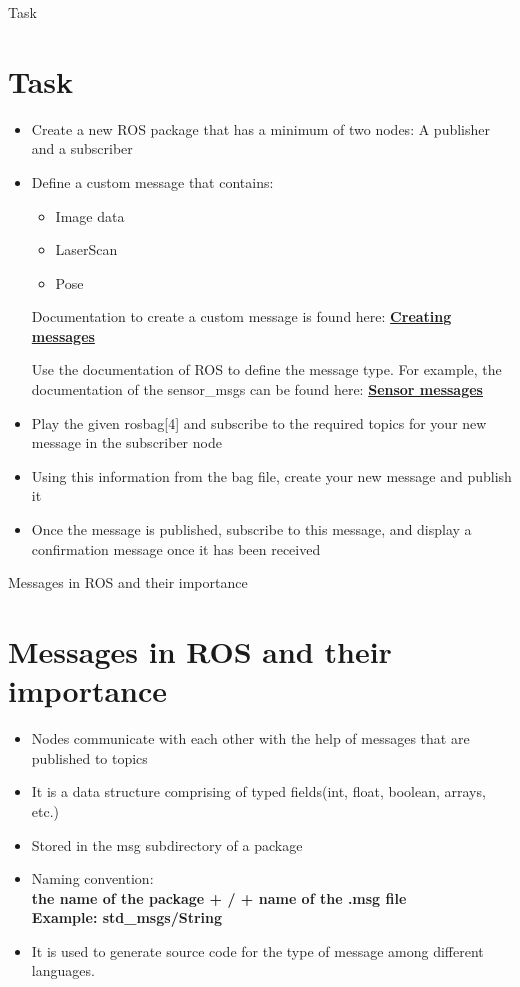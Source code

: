 \documentclass{beamer}
\begin{document}
\begin{frame}{Task}
	\section{Task}
	\begin{itemize}
		\item Create a new ROS package that has a minimum of two nodes: A publisher and a subscriber
		\item Define a custom message that contains:
		\begin{itemize}
			\item Image data
			\item LaserScan
			\item Pose 
		\end{itemize}
		Documentation to create a custom message is found here: 
	    \textbf{\href{http://wiki.ros.org/ROS/Tutorials/CreatingMsgAndSrv}{Creating messages}}
	    
		Use the documentation of ROS to define the message type. For example, the documentation of the sensor\_msgs can be found here: \textbf{\href{http://docs.ros.org/api/sensor_msgs/html/index-msg.html}{Sensor messages}}
		\item Play the given rosbag[4] and subscribe to the required topics for your new message in the subscriber node
		\item Using this information from the bag file, create your new message and publish it
		\item Once the message is published, subscribe to this message, and display a confirmation message once it has been received
	\end{itemize}
\end{frame}

\begin{frame}{Messages in ROS and their importance}
	\section{Messages in ROS and their importance}
	\begin{itemize}
		\item Nodes communicate with each other with the help of messages that are published to topics
		\item It is a data structure comprising of typed fields(int, float, boolean, arrays, etc.)
		\item Stored in the msg subdirectory of a package
		\item Naming convention:\\ \textbf{the name of the package + / + name of the .msg file \\ Example:  std\_msgs/String}
		\item It is used to generate source code for the type of message among different languages.
	\end{itemize}
\end{frame}
\end{document}
